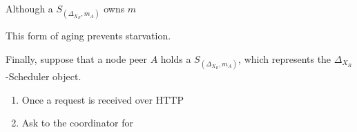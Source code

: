 \documentclass[10pt,a4paper]{article}
\theoremstyle{definition}
\begin{document}
Although a $S_{(\Delta_{X_{R}},m_A)}$ owns $m$ 




This form of aging prevents starvation. 


Finally, suppose that a node peer $A$ holds a $S_{(\Delta_{X_{R}},m_A)}$, which represents the 
$\Delta_{X_{R}}$-Scheduler object.

\begin{enumerate}
\item Once a request is received over HTTP
\item Ask to the coordinator for 
\end{enumerate}
























\end{document}
